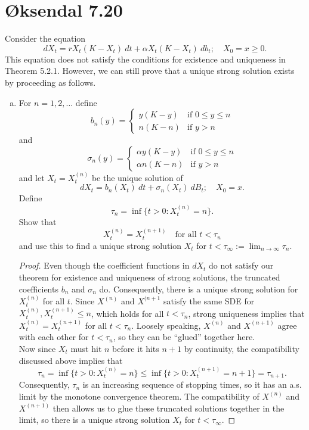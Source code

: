 \documentclass[11pt,letterpaper]{report}
\theoremstyle{definition}
\begin{document}
\section*{\O ksendal 7.20}
Consider the equation
\[
dX_t = rX_t(K-X_t)\ dt + \alpha X_t(K-X_t)\ db_t;\quad X_0 = x\geq 0.
\]
This equation does not satisfy the conditions for existence and uniqueness in Theorem 5.2.1. However, we can still prove that a unique strong solution exists by proceeding as follows.
\begin{enumerate}[(a)]
	\item For $n = 1, 2, \ldots$ define
	\[
	b_n(y) = \begin{cases}
		y(K-y)&\text{if }0\leq y\leq n\\
		n(K-n)&\text{if }y>n
	\end{cases}
	\]
	and
	\[
	\sigma_n(y) = \begin{cases}
		\alpha y(K-y)&\text{if }0\leq y\leq n\\
		\alpha n(K-n)&\text{if }y>n
	\end{cases}
	\]
	and let $X_t = X^{(n)}_t$ be the unique solution of
	\[
	dX_t = b_n(X_t)\ dt + \sigma_n(X_t)\ dB_t;\quad X_0 = x.
	\]
	Define
	\[
	\tau_n = \inf\{t>0: X_t^{(n)} = n\}.
	\]
	Show that
	\[
	X^{(n)}_t = X^{(n+1)}_t\quad\text{for all }t<\tau_n
	\]
	and use this to find a unique strong solution $X_t$ for $t<\tau_\infty:= \lim_{n\to \infty} \tau_n$.
	\begin{proof}
		Even though the coefficient functions in $dX_t$ do not satisfy our theorem for existence and uniqueness of strong solutions, the truncated coefficients $b_n$ and $\sigma_n$ do. Consequently, there is a unique strong solution for $X_t^{(n)}$ for all $t$. Since $X^{(n)}$ and $X^{(n+1}$ satisfy the same SDE for $X_t^{(n)}, X_t^{(n+1)}\leq n$, which holds for all $t<\tau_n$, strong uniqueness implies that $X_t^{(n)} = X_t^{(n+1)}$ for all $t<\tau_n$. Loosely speaking, $X^{(n)}$ and $X^{(n+1)}$ agree with each other for $t<\tau_n$, so they can be ``glued'' together here.\\

		\noindent Now since $X_t$ must hit $n$ before it hits $n+1$ by continuity, the compatibility discussed above implies that
		\[
		\tau_n = \inf\{t>0: X_t^{(n)}=n\} \leq \inf\{t>0: X_t^{(n+1)} = n+1\} = \tau_{n+1}.
		\]
		Consequently, $\tau_n$ is an increasing sequence of stopping times, so it has an a.s. limit by the monotone convergence theorem. The compatibility of $X^{(n)}$ and $X^{(n+1)}$ then allows us to glue these truncated solutions together in the limit, so there is a unique strong solution $X_t$ for $t<\tau_\infty$.
	\end{proof}



\end{enumerate}
\end{document}

